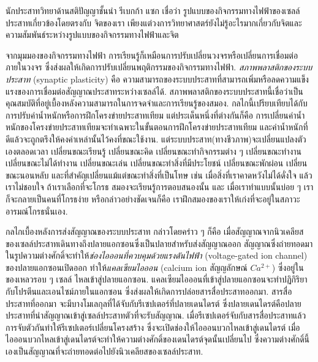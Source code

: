 {\begin{shaded}
		นักประสาทวิทยาด้านสติปัญญาชั้นนำ รีเบกก้า แซก\cite{Saxe2012a} เชื่อว่า
		รูปแบบของกิจกรรมทางไฟฟ้าของเซลล์ประสาทเกี่ยวข้องโดยตรงกับ%
		จิตของเรา
		เพียงแต่วงการวิทยาศาสตร์ยังไม่รู้อะไรมากเกี่ยวกับจิตและความสัมพันธ์ระหว่างรูปแบบของกิจกรรมทางไฟฟ้าและจิต
		
		จากมุมมองของกิจกรรมทางไฟฟ้า
		การเรียนรู้ก็เหมือนการปรับเปลี่ยนวงจรหรือเปลี่ยนการเชื่อมต่อภายในวงจร ซึ่งส่งผลให้เกิดการปรับเปลี่ยนพฤติกรรมของกิจกรรมทางไฟฟ้า.
		\textit{สภาพพลาสติกของระบบประสาท} (synaptic plasticity) คือ ความสามารถของระบบประสาทที่สามารถเพิ่มหรือลดความแข็งแรงของการเชื่อมต่อสัญญาณประสาทระหว่างเซลล์ได้.
		สภาพพลาสติกของระบบประสาทนี้เชื่อว่าเป็นคุณสมบัติที่อยู่เบื้องหลังความสามารถในการจดจำและการเรียนรู้ของสมอง.
		กลไกนี้เปรียบเทียบได้กับการปรับค่าน้ำหนักหรือการฝึกโครงข่ายประสาทเทียม
		แต่ประเด็นหนึ่งที่ต่างกันก็คือ
		การเปลี่ยนค่าน้ำหนักของโครงข่ายประสาทเทียมจะทำเฉพาะในขั้นตอนการฝึกโครงข่ายประสาทเทียม
		และค่าน้ำหนักที่ดีแล้วจะถูกตรึงให้คงค่าเหล่านั้นไว้คงที่ขณะใช้งาน.
		แต่ระบบประสาท(ทางชีวภาพ)จะเปลี่ยนแปลงตัวเองตลอดเวลา 
		เปลี่ยนขณะเรียนรู้ เปลี่ยนขณะคิด เปลี่ยนขณะทำกิจกรรมต่าง ๆ เปลี่ยนขณะทำงาน เปลี่ยนขณะไม่ได้ทำงาน เปลี่ยนขณะเล่น เปลี่ยนขณะทำสิ่งที่มีประโยชน์ เปลี่ยนขณะพักผ่อน เปลี่ยนขณะนอนหลับ และที่สำคัญเปลี่ยนแม้แต่ขณะทำสิ่งที่เป็นโทษ เช่น เมื่อสิ่งที่เราคาดหวังไม่ได้ดั่งใจ แล้วเราไม่ชอบใจ ถ้าเราเลือกที่จะโกรธ สมองจะเรียนรู้การตอบสนองนั้น และ
		เมื่อเราทำแบบนั้นบ่อย ๆ เราก็จะกลายเป็นคนที่โกรธง่าย หรือกล่าวอย่างชัดเจนก็คือ เราฝึกสมองของเราให้เก่งที่จะอยู่ในสภาวะอารมณ์โกรธนั่นเอง.
		
		กลไกเบื้องหลังการส่งสัญญาณของระบบประสาท
		กล่าวโดยคร่าว ๆ ก็คือ 
		เมื่อสัญญาณจากนิวเคลียสของเซลล์ประสาทเดินทางถึงปลายแอกซอนซึ่งเป็นปลายสำหรับส่งสัญญาณออก
		สัญญาณซึ่งถ่ายทอดมาในรูปความต่างศักดิ์จะทำให้\textit{ช่องไอออนที่ควบคุมด้วยแรงดันไฟฟ้า} (voltage-gated ion channel) ของปลายแอกซอนเปิดออก
		ทำให้\textit{แคลเซียมไอออน} (calcium ion สัญญลักษณ์ $Ca^{2+}$) ซึ่งอยู่ในของเหลวรอบ ๆ เซลล์ ไหลเข้าสู่ปลายแอกซอน.
		แคลเซียมไอออนที่เข้าสู่ปลายแอกซอนจะทำปฏิกิริยากับโปรตีนและเอนไซม์ภายในแอกซอน
		ซึ่งส่งผลให้เกิดการปล่อยสารสื่อประสาทออกมา.
		สารสื่อประสาทที่ออกมา
		จะมีบางโมเลกุลที่ได้จับกับรีเซปเตอร์ที่ปลายเดนไดรต์ ซึ่งปลายเดนไดรต์คือปลายประสาทที่นำสัญญาณเข้าสู่เซลล์ประสาทตัวที่จะรับสัญญาณ.
		เมื่อรีเซปเตอร์จับกับสารสื่อประสาทแล้ว การจับตัวกันทำให้รีเซปเตอร์เปลี่ยนโครงสร้าง ซึ่งจะเปิดช่องให้ไอออนบวกไหลเข้าสู่เดนไดรต์ เมื่อไอออนบวกไหลเข้าสู่เดนไดรต์จะทำให้ความต่างศักดิ์ของเดนไดรต์จุดนั้นเปลี่ยนไป
		ซึ่งความต่างศักดิ์นี้เองเป็นสัญญาณที่จะถ่ายทอดต่อไปยังนิวเคลียสของเซลล์ประสาท.
		

\end{shaded}}
